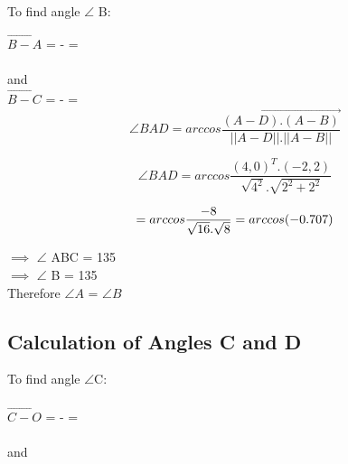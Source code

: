 \documentclass[journal,10pt,twocolumn]{article}
\begin{document}
\vspace{0.5cm}
\begin{flushleft}
To find angle $\angle$ B: \\
\end{flushleft}

\vspace{0.35cm}
$\vec{B-A}$ = -
	= 
	\\
	\vspace{0.3cm}\\
and \\

$\vec{B-C}$ =  - =  
\vspace{0.25cm}	
\begin{equation}
\angle BAD = arccos \vec {\frac{(A-D).(A-B)}{||A-D||.||A-B||}}
\end{equation}

\begin{equation}
\angle BAD = arccos \frac{(4, 0)^T .(-2, 2)}{\sqrt{4^2}.\sqrt{2^2+2^2} }
\end{equation}

\begin{equation}
= arccos \frac{-8 } {\sqrt{16}.\sqrt{8}} =arccos (-0.707)
\\
\end{equation}

\begin{flushleft}
$\implies$   $\angle$ ABC = 135 \textdegree\\
\vspace{0.3cm}
$\implies$   $\angle$ B = 135 \textdegree
\\
\vspace{0.3cm}
Therefore $\angle A$ = $\angle B$
\end{flushleft}

\subsection{Calculation of Angles C and D}
\vspace{0.25cm}

To find angle $\angle$C:\\
\vspace{0.25cm}\\
$\vec{C-O}$ =  - 
	= 
	\\
	\vspace{0.3cm}\\
and \\
\end{document}
